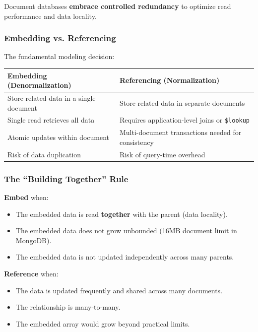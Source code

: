 \documentclass[12pt,a4paper]{article}
\begin{document}
Document databases \textbf{embrace controlled redundancy} to optimize read performance and data locality.

\subsubsection{Embedding vs. Referencing}

The fundamental modeling decision:

\begin{center}
\begin{tabular}{@{}p{}p{}@{}}
\toprule
\textbf{Embedding (Denormalization)} & \textbf{Referencing (Normalization)} \\
\midrule
Store related data in a single document & Store related data in separate documents \\
Single read retrieves all data & Requires application-level joins or \texttt{\$lookup} \\
Atomic updates within document & Multi-document transactions needed for consistency \\
Risk of data duplication & Risk of query-time overhead \\
\bottomrule
\end{tabular}
\end{center}

\subsubsection{The ``Building Together'' Rule}

\begin{keyinsight}
\textbf{Embed} when:
\begin{itemize}[noitemsep]
    \item The embedded data is read \textbf{together} with the parent (data locality).
    \item The embedded data does not grow unbounded (16MB document limit in MongoDB).
    \item The embedded data is not updated independently across many parents.
\end{itemize}

\textbf{Reference} when:
\begin{itemize}[noitemsep]
    \item The data is updated frequently and shared across many documents.
    \item The relationship is many-to-many.
    \item The embedded array would grow beyond practical limits.
\end{itemize}
\end{keyinsight}
\end{document}
